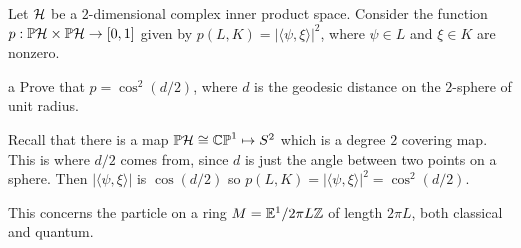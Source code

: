 \documentclass{pset}
\theoremstyle{plain}
\begin{document}
\begin{problem}{2}
  Let $\mathcal{H}$ be a $2$-dimensional complex inner product space. Consider the function $p :\mathbb{P}\mathcal{H} \times \mathbb{P}\mathcal{H} \to [0,1]$ given by $p(L, K) = |\langle \psi, \xi\rangle|^2$, where $\psi\in L$ and $\xi\in K$ are nonzero.
\end{problem}

\begin{parts}
  \begin{part}{a}
    Prove that $p=\cos^2(d/2)$, where $d$ is the geodesic distance on the $2$-sphere of unit radius.
  \end{part}

  Recall that there is a map $\mathbb{P}\mathcal{H} \cong \mathbb{CP}^1 \mapsto S^2$ which is a degree $2$ covering map. This is where $d/2$ comes from, since $d$ is just the angle between two points on a sphere. Then $|\langle \psi, \xi\rangle|$ is $\cos(d/2)$ so $p(L,K) = |\langle \psi, \xi \rangle|^2 = \cos^2(d/2)$.
\end{parts}

\begin{problem}{3}
  This concerns the particle on a ring $M = \mathbb{E}^1 / 2\pi L\mathbb{Z}$ of length $2\pi L$, both classical and quantum.
\end{problem}
\end{document}
